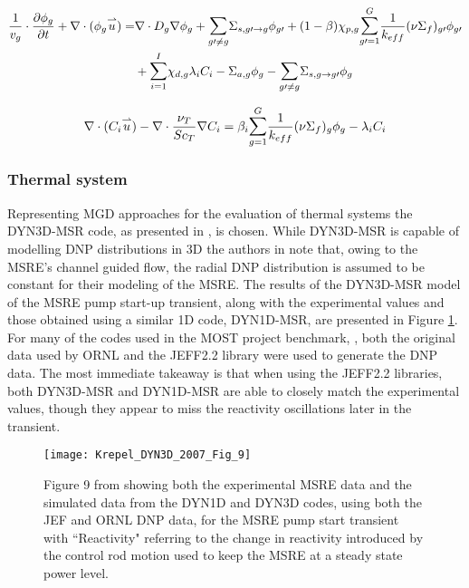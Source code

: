 \documentclass[review]{elsarticle}
\begin{document}
\begin{equation}
\label{eq:mgd}
\begin{split}
\frac{1}{v_{g}} \cdot \frac{\partial \phi_{g}}{\partial t} + \nabla \cdot
    (\phi_{g} \overset{\rightharpoonup}u) = & \nabla \cdot D_{g} \nabla \phi_{g}
    + \mathlarger{\sum}_{g \prime \not= g} \Sigma_{s,g \prime \rightarrow g}
    \phi_{g \prime} + (1-\beta)\chi_{p,g}
    \mathlarger{\sum}_{g \prime = 1}^{G}\frac{1}{k_{eff}}
    (\nu \Sigma_{f})_{g \prime}\phi_{g\prime}\\ &+ 
    \mathlarger{\sum}_{i = 1}^{I}\chi_{d,g}\lambda_{i}C_{i} 
     - \Sigma_{a,g}\phi_{g} - \mathlarger{\sum}_{g \prime \not= g} 
    \Sigma_{s,g \rightarrow g \prime} \phi_{g} 
\end{split}
\end{equation}

\begin{equation}
\label{eq:mgd_dnp}
\nabla \cdot (C_{i} \overset{\rightharpoonup}u) - 
    \nabla \cdot \frac{\nu_{T}}{Sc_{T}}\nabla C_{i}
    = \beta_{i} \mathlarger{\sum}_{g = 1}^{G} \frac{1}{k_{eff}} 
    (\nu \Sigma_{f})_{g} \phi_{g} - \lambda_{i} C_{i}
\end{equation}

\subsubsection{Thermal system} \label{sssec:mgd_ts}
Representing MGD approaches for the evaluation of thermal systems the DYN3D-MSR
code, as presented in \cite{krepel_dyn3d-msr_2007}, is chosen. While DYN3D-MSR is
capable of modelling DNP distributions in 3D the authors in
\cite{krepel_dyn3d-msr_2007} note that, owing to the MSRE's channel guided flow,
the radial DNP distribution is assumed to be constant for their modeling of the MSRE.
The results of the DYN3D-MSR model of the MSRE pump start-up transient,
along with the experimental values and those obtained using a similar 1D code,
DYN1D-MSR, are presented in Figure \ref{fig:krepel_dyn3d_msre_pump_start}.
For many of the codes used in the
MOST project benchmark, \cite{delpech_benchmark_2003}, both the original data used
by ORNL and the JEFF2.2 library were used to generate the DNP data. The most
immediate takeaway is that when using the JEFF2.2 libraries, both DYN3D-MSR and
DYN1D-MSR are able to closely match the experimental values, though they appear to
miss the reactivity oscillations later in the transient.

\begin{figure}[H]
   \centering
   \texttt{[image: Krepel\_DYN3D\_2007\_Fig\_9]}
   \caption{Figure 9 from \cite{krepel_dyn3d-msr_2007} showing both the experimental MSRE data
   and the simulated data from the DYN1D and DYN3D codes, using both the JEF and ORNL DNP data, for
   the MSRE pump start transient with ``Reactivity" referring to the change in reactivity introduced
   by the control rod motion used to keep the MSRE at a steady state power level.} 
   \label{fig:krepel_dyn3d_msre_pump_start}
\end{figure}
\end{document}
